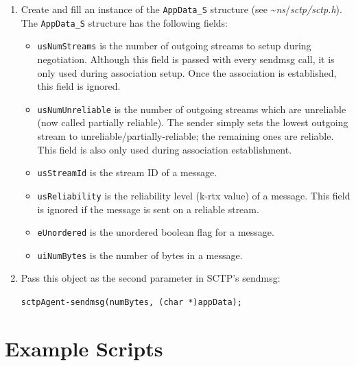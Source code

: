       \begin{enumerate}

	 \item Create and fill an instance of the {\tt AppData\_S}
	 structure (see \textasciitilde\emph{ns}/{\em{sctp/sctp.h}}). The {\tt AppData\_S}
	 structure has the following fields:

	 \begin{itemize}

	    \item[] {\tt usNumStreams} is the number of outgoing streams
	    to setup during negotiation. Although this field is passed
	    with every sendmsg call, it is only used during association
	    setup. Once the association is established, this field is
	    ignored.

	    \item[] {\tt usNumUnreliable} is the number of outgoing
	    streams which are unreliable (now called partially
	    reliable). The sender simply sets the lowest outgoing stream
	    to unreliable/partially-reliable; the remaining ones are
	    reliable. This field is also only used during association
	    establishment.

	    \item[] {\tt usStreamId} is the stream ID of a message.

	    \item[] {\tt usReliability} is the reliability level (k-rtx
	    value) of a message. This field is ignored if the message is
	    sent on a reliable stream.

	    \item[] {\tt eUnordered} is the unordered boolean flag for a
	    message.

	    \item[] {\tt uiNumBytes} is the number of bytes in a message.

	 \end{itemize}

	 \item Pass this object as the second parameter in SCTP's sendmsg:

	 {\tt sctpAgent-\>sendmsg(numBytes, (char *)appData);}

      \end{enumerate}

   \section{Example Scripts}
   \label{sec:sctpExamples}

